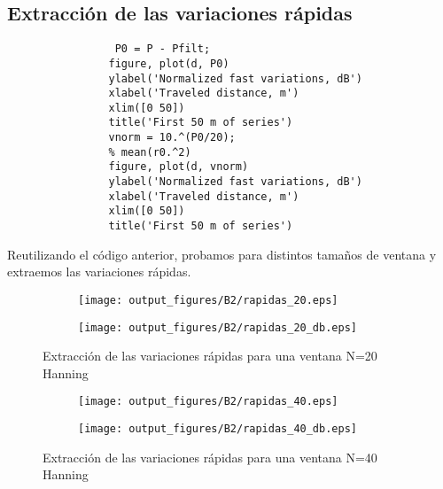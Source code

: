 \documentclass{article}
\begin{document}
        \subsection{Extracción de las variaciones rápidas}
            \begin{lstlisting}
                 P0 = P - Pfilt;
                figure, plot(d, P0)
                ylabel('Normalized fast variations, dB')
                xlabel('Traveled distance, m')
                xlim([0 50])
                title('First 50 m of series')
                vnorm = 10.^(P0/20);
                % mean(r0.^2)   
                figure, plot(d, vnorm)
                ylabel('Normalized fast variations, dB')
                xlabel('Traveled distance, m')
                xlim([0 50])
                title('First 50 m of series')  
            \end{lstlisting}
            \par Reutilizando el código anterior, probamos para distintos tamaños de ventana y extraemos las variaciones rápidas.
            \begin{figure}[h]
                \centering
                \begin{subfigure}
                    \centering          \texttt{[image: output\_figures/B2/rapidas\_20.eps]}
               \end{subfigure}
               \begin{subfigure}
                    \centering          \texttt{[image: output\_figures/B2/rapidas\_20\_db.eps]}
               \end{subfigure}    
               \caption{Extracción de las variaciones rápidas para una ventana N=20 Hanning}
                \label{fig:sup_rugosas}
        \end{figure}
        \begin{figure}[h]
                \centering
                \begin{subfigure}
                    \centering          \texttt{[image: output\_figures/B2/rapidas\_40.eps]}
               \end{subfigure}
               \begin{subfigure}
                    \centering          \texttt{[image: output\_figures/B2/rapidas\_40\_db.eps]}
               \end{subfigure}    
               \caption{Extracción de las variaciones rápidas para una ventana N=40 Hanning}
                \label{fig:sup_rugosas}
        \end{figure}
\end{document}
